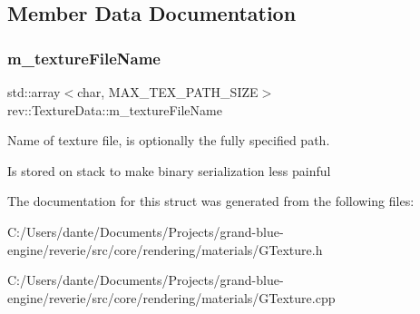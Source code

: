 \subsection{Member Data Documentation}
\mbox{\label{structrev_1_1_texture_data_a389c7fd86b45d4b3d18a58d4f0f5a1a7}} 
\subsubsection{\texorpdfstring{m\_textureFileName}{m\_textureFileName}}
{\footnotesize\ttfamily std\+::array$<$char, M\+A\+X\+\_\+\+T\+E\+X\+\_\+\+P\+A\+T\+H\+\_\+\+S\+I\+ZE$>$ rev\+::\+Texture\+Data\+::m\+\_\+texture\+File\+Name}



Name of texture file, is optionally the fully specified path. 

Is stored on stack to make binary serialization less painful 

The documentation for this struct was generated from the following files\+:\begin{DoxyCompactItemize}
\item 
C\+:/\+Users/dante/\+Documents/\+Projects/grand-\/blue-\/engine/reverie/src/core/rendering/materials/G\+Texture.\+h\item 
C\+:/\+Users/dante/\+Documents/\+Projects/grand-\/blue-\/engine/reverie/src/core/rendering/materials/G\+Texture.\+cpp\end{DoxyCompactItemize}
